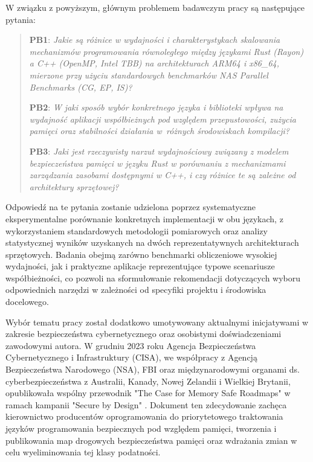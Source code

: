 W związku z powyższym, głównym problemem badawczym pracy są następujące pytania:
\begin{quote}
    \item \textbf{PB1}: 
    \emph{Jakie są różnice w wydajności i charakterystykach skalowania mechanizmów programowania równoległego między językami Rust (Rayon) a C++ (OpenMP, Intel TBB) na architekturach ARM64 i x86\_64, mierzone przy użyciu standardowych benchmarków NAS Parallel Benchmarks (CG, EP, IS)?}
    \item \textbf{PB2}:
    \emph{W jaki sposób wybór konkretnego języka i biblioteki wpływa na wydajność aplikacji współbieżnych pod względem przepustowości, zużycia pamięci oraz stabilności działania w~różnych środowiskach kompilacji?}
    \item \textbf{PB3}:
    \emph{Jaki jest rzeczywisty narzut wydajnościowy związany z modelem bezpieczeństwa pamięci w języku Rust w porównaniu z mechanizmami zarządzania zasobami dostępnymi w C++, i czy różnice te są zależne od architektury sprzętowej?}
\end{quote}
Odpowiedź na te pytania zostanie udzielona poprzez systematyczne eksperymentalne porównanie konkretnych implementacji w obu językach, z wykorzystaniem standardowych metodologii pomiarowych oraz analizy statystycznej wyników uzyskanych na dwóch reprezentatywnych architekturach sprzętowych. Badania obejmą zarówno benchmarki obliczeniowe wysokiej wydajności, jak i praktyczne aplikacje reprezentujące typowe scenariusze współbieżności, co pozwoli na sformułowanie rekomendacji dotyczących wyboru odpowiednich narzędzi w zależności od specyfiki projektu i środowiska docelowego.

Wybór tematu pracy został dodatkowo umotywowany aktualnymi inicjatywami w zakresie bezpieczeństwa cybernetycznego oraz osobistymi doświadczeniami zawodowymi autora. W grudniu 2023 roku Agencja Bezpieczeństwa Cybernetycznego i Infrastruktury (CISA), we współpracy z Agencją Bezpieczeństwa Narodowego (NSA), FBI oraz międzynarodowymi organami ds. cyberbezpieczeństwa z Australii, Kanady, Nowej Zelandii i Wielkiej Brytanii, opublikowała wspólny przewodnik "The Case for Memory Safe Roadmaps" w ramach kampanii "Secure by Design" \cite{DoD2023MemorySafe}. Dokument ten zdecydowanie zachęca kierownictwo producentów oprogramowania do priorytetowego traktowania języków programowania bezpiecznych pod względem pamięci, tworzenia i publikowania map drogowych bezpieczeństwa pamięci oraz wdrażania zmian w celu wyeliminowania tej klasy podatności.

